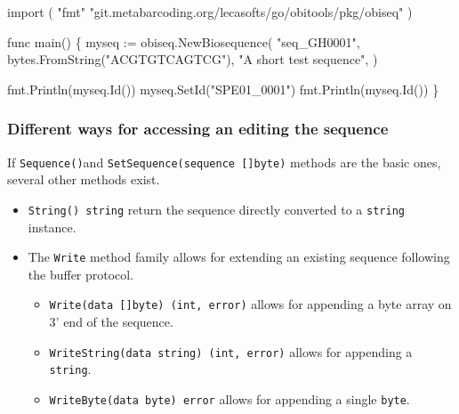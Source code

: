 \documentclass[
  letterpaper,
  DIV=11,
  numbers=noendperiod]{scrreprt}
\newenvironment{Shaded}{\begin{snugshade}}{\end{snugshade}}
\newcommand{\KeywordTok}[1]{\textcolor[rgb]{0.00,0.23,0.31}{#1}}
\newcommand{\NormalTok}[1]{\textcolor[rgb]{0.00,0.23,0.31}{#1}}
\newcommand{\OperatorTok}[1]{\textcolor[rgb]{0.37,0.37,0.37}{#1}}
\newcommand{\StringTok}[1]{\textcolor[rgb]{0.13,0.47,0.30}{#1}}
\providecommand{\tightlist}{%
  \setlength{\itemsep}{0pt}\setlength{\parskip}{0pt}}\usepackage{longtable,booktabs,array}
\begin{document}
\begin{Shaded}
\begin{Highlighting}[]
\KeywordTok{import} \OperatorTok{(}
    \StringTok{"fmt"}
    \StringTok{"git.metabarcoding.org/lecasofts/go/obitools/pkg/obiseq"}
\OperatorTok{)}

\KeywordTok{func}\NormalTok{ main}\OperatorTok{()} \OperatorTok{\{}
\NormalTok{    myseq }\OperatorTok{:=}\NormalTok{ obiseq}\OperatorTok{.}\NormalTok{NewBiosequence}\OperatorTok{(}
        \StringTok{"seq\_GH0001"}\OperatorTok{,}
\NormalTok{        bytes}\OperatorTok{.}\NormalTok{FromString}\OperatorTok{(}\StringTok{"ACGTGTCAGTCG"}\OperatorTok{),}
        \StringTok{"A short test sequence"}\OperatorTok{,}
        \OperatorTok{)}

\NormalTok{    fmt}\OperatorTok{.}\NormalTok{Println}\OperatorTok{(}\NormalTok{myseq}\OperatorTok{.}\NormalTok{Id}\OperatorTok{())}
\NormalTok{    myseq}\OperatorTok{.}\NormalTok{SetId}\OperatorTok{(}\StringTok{"SPE01\_0001"}\OperatorTok{)}
\NormalTok{    fmt}\OperatorTok{.}\NormalTok{Println}\OperatorTok{(}\NormalTok{myseq}\OperatorTok{.}\NormalTok{Id}\OperatorTok{())}
\OperatorTok{\}}
\end{Highlighting}
\end{Shaded}

\hypertarget{different-ways-for-accessing-an-editing-the-sequence}{%
\subsubsection*{Different ways for accessing an editing the
sequence}\label{different-ways-for-accessing-an-editing-the-sequence}}

If \texttt{Sequence()}and \texttt{SetSequence(sequence\ {[}{]}byte)}
methods are the basic ones, several other methods exist.

\begin{itemize}
\tightlist
\item
  \texttt{String()\ string} return the sequence directly converted to a
  \texttt{string} instance.
\item
  The \texttt{Write} method family allows for extending an existing
  sequence following the buffer protocol.

  \begin{itemize}
  \tightlist
  \item
    \texttt{Write(data\ {[}{]}byte)\ (int,\ error)} allows for appending
    a byte array on 3' end of the sequence.
  \item
    \texttt{WriteString(data\ string)\ (int,\ error)} allows for
    appending a \texttt{string}.
  \item
    \texttt{WriteByte(data\ byte)\ error} allows for appending a single
    \texttt{byte}.
  \end{itemize}
\end{itemize}
\end{document}
